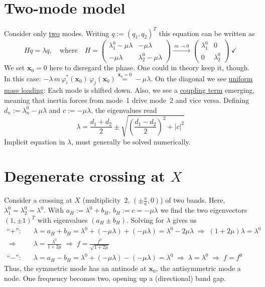 \section{Two-mode model}

Consider only \underline{two} modes. Writing $q := (q_1, q_2)^T$ this equation
can be written as
\begin{equation}
  H q = \lambda q , \quad\text{where}\quad
  H = \begin{pmatrix}
        \lambda_1^0 - \mu\lambda & -\mu\lambda \\
        -\mu\lambda & \lambda_2^0 - \mu\lambda
      \end{pmatrix}
  \xrightarrow{\;m \to 0\;}
  \begin{pmatrix}
    \lambda_1^0 & 0 \\
    0 & \lambda_2^0
  \end{pmatrix} \ \checkmark
\end{equation}
We set $\mathbf{x}_0 = 0$ here to disregard the phase. One could in theory keep
it, though. In this case:
$-\lambda\, m\,\varphi_i^*(\mathbf{x}_0)\,\varphi_j(\mathbf{x}_0)
\overset{\mathbf{x}_0 = 0}{=} -\mu\lambda$.%
On the diagonal we see \underline{uniform mass loading}: Each mode is shifted
down. Also, we see a \underline{coupling term} emerging, meaning that inertia
forces from mode~1 drive mode~2 and vice
versa. Defining $d_n := \lambda_n^0 - \mu\lambda$ and $c := -\mu\lambda$, the
eigenvalues read
\begin{equation}
  \lambda = \frac{d_1 + d_2}{2} \pm \sqrt{\left(\frac{d_1 - d_2}{2}\right)^2 + |c|^2}
\end{equation}
Implicit equation in $\lambda$, must generally be solved numerically.

\section{Degenerate crossing at $X$}

Consider a crossing at $X$ (multiplicity~2, $(\pm\frac{\pi}{a}, 0)$) of two
bands. Here, $\lambda_1^0 = \lambda_2^0 = \lambda^0$. With
$a_H := \lambda^0 + b_H$, $b_H := c = -\mu\lambda$ we find the two eigenvectors
$(1, \pm 1)^T$ with eigenvalues $(a_H \pm b_H)$. Solving for $\lambda$ gives us
\begin{equation}
\begin{aligned}
  \text{``$+$'':}\quad & \lambda = a_H + b_H = \lambda^0 + (-\mu\lambda) + (-\mu\lambda)
    = \lambda^0 - 2\mu\lambda
    \;\Rightarrow\; (1 + 2\mu)\lambda = \lambda^0 \\
    \;\Rightarrow\; & \lambda = \frac{\lambda^0}{1 + 2\mu}
    \;\Rightarrow\; f = \frac{f^0}{\sqrt{1 + 2\mu}} \\
  \text{``$-$'':}\quad & \lambda = a_H - b_H = \lambda^0 + (-\mu\lambda) - (-\mu\lambda)
    = \lambda^0 \;\Rightarrow\; \lambda = \lambda^0 \;\Rightarrow\; f = f^0
\end{aligned}
\end{equation}
Thus, the symmetric mode has an antinode at $\mathbf{x}_0$, the antisymmetric mode a node. One frequency becomes two, opening up
a (directional) band gap.

